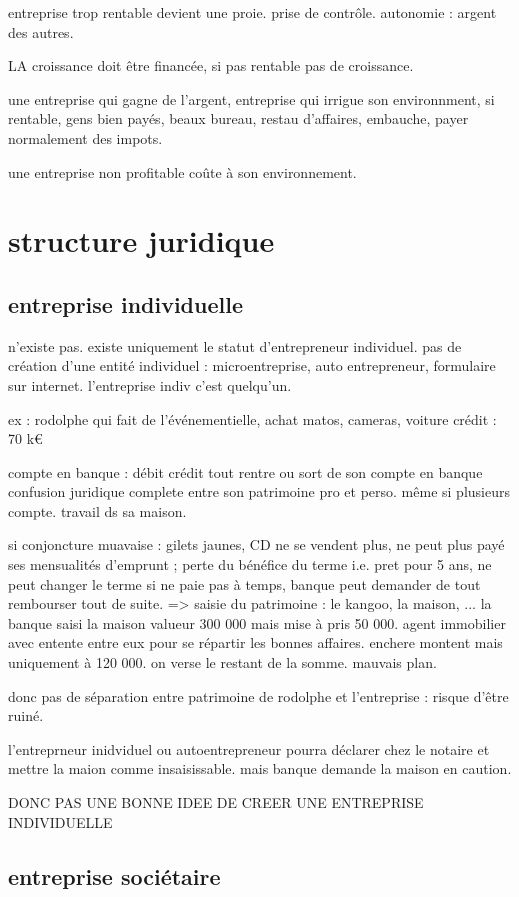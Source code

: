\documentclass[a4paper,12pt]{article}
\begin{document}
entreprise trop rentable devient une proie. prise de contrôle.
autonomie : argent des autres.


LA croissance doit être financée, si pas rentable pas de croissance.

une entreprise qui gagne de l'argent, entreprise qui irrigue son environnment,
si rentable, gens bien payés, beaux bureau, restau d'affaires, embauche, payer normalement 
des impots.

une entreprise non profitable coûte à son environnement.


\section{structure juridique}
\subsection{ entreprise individuelle}
 n'existe pas. existe uniquement le statut d'entrepreneur individuel.
pas de création d'une entité individuel : microentreprise, auto entrepreneur, formulaire sur internet.
l'entreprise indiv c'est quelqu'un.

ex : rodolphe qui fait de l'événementielle, achat matos, cameras, voiture
crédit : 70 k€

compte en banque : débit crédit tout rentre ou sort de son compte en banque
confusion juridique complete entre son patrimoine pro et perso. même si plusieurs compte.
travail ds sa maison.

si conjoncture muavaise : gilets jaunes, CD ne se vendent plus, ne peut plus payé
ses mensualités d'emprunt ; perte du bénéfice du terme i.e. pret pour 5 ans, ne peut changer le terme
si ne paie pas à temps, banque peut demander de tout rembourser tout de suite.
=> saisie du patrimoine : le kangoo, la maison, ...
la banque saisi la maison valueur 300 000 mais mise à pris 50 000. agent immobilier avec entente entre eux pour se répartir les bonnes affaires. enchere montent mais uniquement à 120 000. on verse le restant de la somme.
mauvais plan.

donc pas de séparation entre patrimoine de rodolphe et l'entreprise : risque d'être ruiné.

l'entreprneur inidviduel ou autoentrepreneur pourra déclarer chez le notaire et mettre la maion
comme insaisissable.
mais banque demande la maison en caution.

DONC PAS UNE BONNE IDEE DE CREER UNE ENTREPRISE INDIVIDUELLE
\subsection{entreprise sociétaire}
\end{document}

